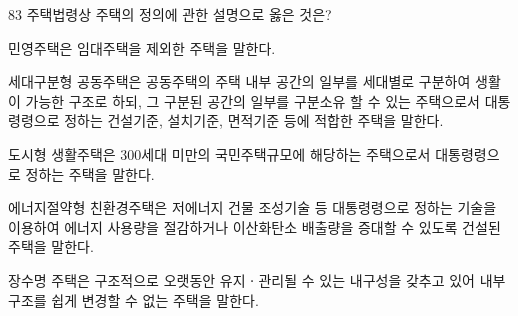 \begin{question}{83}
주택법령상 주택의 정의에 관한 설명으로 옳은 것은?
\begin{choices}
  \item 민영주택은 임대주택을 제외한 주택을 말한다.
  \item 세대구분형 공동주택은 공동주택의 주택 내부 공간의 일부를 세대별로 구분하여 생활이 가능한 구조로 하되, 그 구분된 공간의 일부를 구분소유 할 수 있는 주택으로서 대통령령으로 정하는 건설기준, 설치기준, 면적기준 등에 적합한 주택을 말한다.
  \item 도시형 생활주택은 300세대 미만의 국민주택규모에 해당하는 주택으로서 대통령령으로 정하는 주택을 말한다.
  \item 에너지절약형 친환경주택은 저에너지 건물 조성기술 등 대통령령으로 정하는 기술을 이용하여 에너지 사용량을 절감하거나 이산화탄소 배출량을 증대할 수 있도록 건설된 주택을 말한다.
  \item 장수명 주택은 구조적으로 오랫동안 유지ㆍ관리될 수 있는 내구성을 갖추고 있어 내부 구조를 쉽게 변경할 수 없는 주택을 말한다.
\end{choices}
\end{question}
